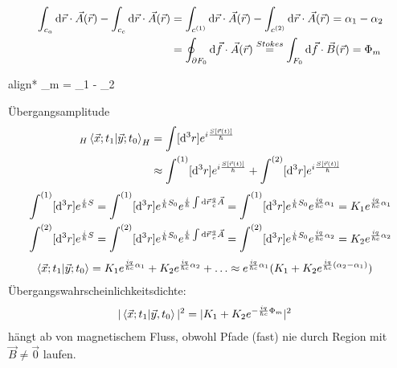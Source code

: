 	\begin{align*}
		\int_{c_a} \mathrm{d} \vec{r} \cdot \vec{A}(\vec{r}) - \int_{c_c} \mathrm{d} \vec{r} \cdot \vec{A}(\vec{r}) &=
		\int_{c^{(1)}} \mathrm{d} \vec{r} \cdot \vec{A}(\vec{r}) - \int_{c^{(2)}} \mathrm{d} \vec{r} \cdot \vec{A}(\vec{r}) = \alpha_1 - \alpha_2 \\
		&= \oint_{\partial F_0} \mathrm{d} \vec{f} \cdot \vec{A}(\vec{r}) 
		\overset{Stokes}{=} \int_{F_0} \mathrm{d} \vec{f} \cdot \vec{B}(\vec{r}) = \Phi_m
	\end{align*}
	\begin{empheq}[box=\boxed]{align*}
		\Phi_m = \alpha_1 - \alpha_2
	\end{empheq}
Übergangsamplitude
	\begin{align*}
		{}_H \braket{\vec{x}; t_1 | \vec{y}; t_0}_H &= 
		\int [\mathrm{d}^3 r] e^{i \frac{S[\vec{r}(t)]}{\hbar}} \\
		&\approx \int^{(1)} [\mathrm{d}^3 r] e^{i \frac{S[\vec{r}(t)]}{\hbar}} 
		+ \int^{(2)} [\mathrm{d}^3 r] e^{i \frac{S[\vec{r}(t)]}{\hbar}} 
	\end{align*}
	\begin{align*}
		\int^{(1)} [\mathrm{d}^3 r] e^{\frac{i}{\hbar} S} &=
		\int^{(1)} [\mathrm{d}^3 r] e^{\frac{i}{\hbar} S_0} e^{\frac{i}{\hbar} \int \mathrm{d} \vec{r} \frac{q}{c} \vec{A}} 
		= \int^{(1)} [\mathrm{d}^3 r] e^{\frac{i}{\hbar} S_0} e^{\frac{iq}{\hbar c} \alpha_1}  
		= K_1 e^{\frac{iq}{\hbar c} \alpha_1}\\
		\int^{(2)} [\mathrm{d}^3 r] e^{\frac{i}{\hbar} S} &=
		\int^{(2)} [\mathrm{d}^3 r] e^{\frac{i}{\hbar} S_0} e^{\frac{i}{\hbar} \int \mathrm{d} \vec{r} \frac{q}{c} \vec{A}} 
		= \int^{(2)} [\mathrm{d}^3 r] e^{\frac{i}{\hbar} S_0} e^{\frac{iq}{\hbar c} \alpha_2}
		=K_2 e^{\frac{iq}{\hbar c} \alpha_2}
	\end{align*}
	\begin{align*}
		\braket{\vec{x}; t_1| \vec{y}; t_0} &= 
		K_1 e^{\frac{iq}{\hbar c} \alpha_1} + K_2 e^{\frac{iq}{\hbar c} \alpha_2} + \ldots 
		\approx e^{\frac{iq}{\hbar c} \alpha_1} (K_1 + K_2 e^{\frac{iq}{\hbar c} (\alpha_2 -\alpha_1)})
	\end{align*}
Übergangswahrscheinlichkeitsdichte:
	\begin{align*}
		|\braket{\vec{x}; t_1 | \vec{y} , t_0}|^2 &=
		| K_1 + K_2 e^{-\frac{iq}{\hbar c} \Phi_m}|^2
	\end{align*}
hängt ab von magnetischem Fluss, obwohl Pfade (fast) nie durch Region mit $\vec{B}\neq \vec{0}$ laufen.


